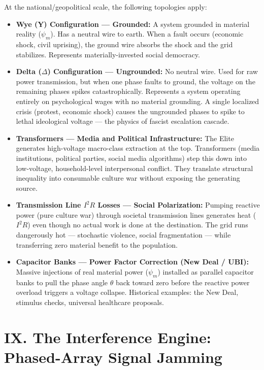 \documentclass[12pt]{book}
\numberwithin{equation}{chapter}
\begin{document}
    At the national/geopolitical scale, the following topologies apply:
  

\begin{itemize}

\item \textbf{Wye (Y) Configuration — Grounded:} A system grounded in material reality ($\psi_m$). Has a neutral wire to earth. When a fault occurs (economic shock, civil uprising), the ground wire absorbs the shock and the grid stabilizes. Represents materially-invested social democracy.

\item \textbf{Delta ($\Delta$) Configuration — Ungrounded:} No neutral wire. Used for raw power transmission, but when one phase faults to ground, the voltage on the remaining phases spikes catastrophically. Represents a system operating entirely on psychological wages with no material grounding. A single localized crisis (protest, economic shock) causes the ungrounded phases to spike to lethal ideological voltage — the physics of fascist escalation cascade.

\item \textbf{Transformers — Media and Political Infrastructure:} The Elite generates high-voltage macro-class extraction at the top. Transformers (media institutions, political parties, social media algorithms) step this down into low-voltage, household-level interpersonal conflict. They translate structural inequality into consumable culture war without exposing the generating source.

\item \textbf{Transmission Line $I^2R$ Losses — Social Polarization:} Pumping reactive power (pure culture war) through societal transmission lines generates heat ($I^2R$) even though no actual work is done at the destination. The grid runs dangerously hot — stochastic violence, social fragmentation — while transferring zero material benefit to the population.

\item \textbf{Capacitor Banks — Power Factor Correction (New Deal / UBI):} Massive injections of real material power ($\psi_m$) installed as parallel capacitor banks to pull the phase angle $\theta$ back toward zero before the reactive power overload triggers a voltage collapse. Historical examples: the New Deal, stimulus checks, universal healthcare proposals.

\end{itemize}

\section{IX. The Interference Engine: Phased-Array Signal Jamming}
\end{document}
